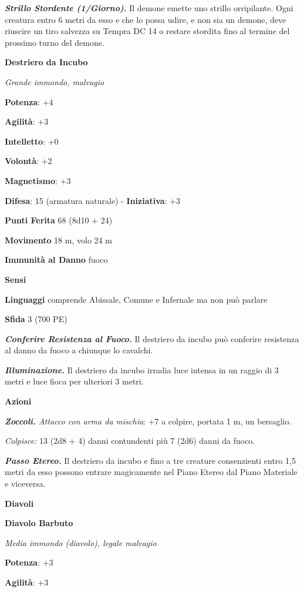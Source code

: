 \begin{multicols}{2}
\emph{\textbf{Strillo Stordente (1/Giorno).}} Il demone emette uno
strillo orripilante. Ogni creatura entro 6 metri da esso e che lo possa
udire, e non sia un demone, deve riuscire un tiro salvezza su Tempra DC 14 o restare stordita fino al termine del prossimo turno
del demone.


\textbf{Destriero da Incubo}

\emph{Grande immondo, malvagio}

\textbf{Potenza}: +4

\textbf{Agilità}: +3

\textbf{Intelletto}: +0

\textbf{Volontà}: +2

\textbf{Magnetismo}: +3

\textbf{Difesa}: 15 (armatura naturale) - \textbf{Iniziativa}: +3

\textbf{Punti Ferita} 68 (8d10 + 24)

\textbf{Movimento} 18 m, volo 24 m

\textbf{Immunità al Danno} fuoco

\textbf{Sensi} 

\textbf{Linguaggi} comprende Abissale, Comune e Infernale ma non può
parlare

\textbf{Sfida} 3 (700 PE)\smallskip

\emph{\textbf{Conferire Resistenza al Fuoco.}} Il destriero da incubo
può conferire resistenza al danno da fuoco a chiunque lo cavalchi.

\emph{\textbf{Illuminazione.}} Il destriero da incubo irradia luce
intensa in un raggio di 3 metri e luce fioca per ulteriori 3 metri.

\smallskip\textbf{Azioni}

\emph{\textbf{Zoccoli.} Attacco con arma da mischia}: +7 a colpire,
portata 1 m, un bersaglio.

\emph{Colpisce:} 13 (2d8 + 4) danni contundenti più 7 (2d6) danni da
fuoco.

\emph{\textbf{Passo Etereo.}} Il destriero da incubo e fino a tre
creature consenzienti entro 1,5 metri da esso possono entrare
magicamente nel Piano Etereo dal Piano Materiale e viceversa.

\textbf{Diavoli}

\textbf{Diavolo Barbuto}

\emph{Media immondo (diavolo), legale malvagio}

\textbf{Potenza}: +3

\textbf{Agilità}: +3


\end{multicols}
